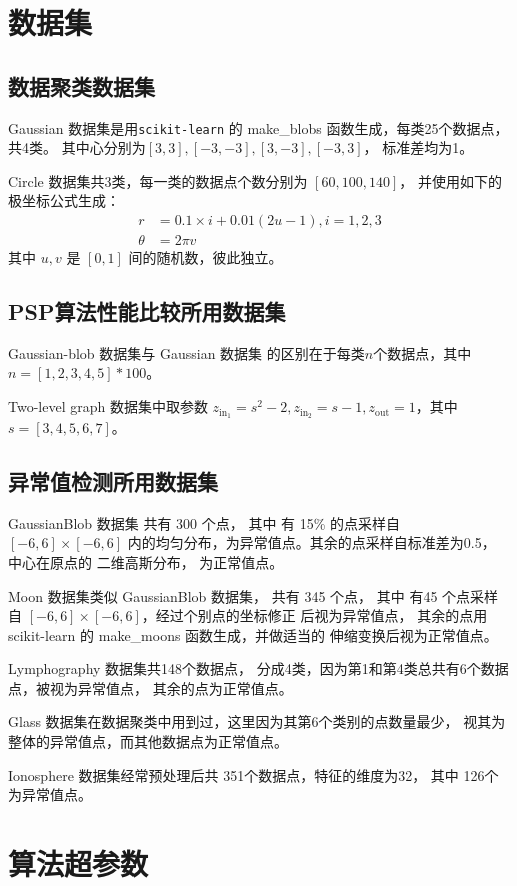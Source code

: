 \section{数据集}

\subsection{数据聚类数据集}
Gaussian 数据集是用\texttt{scikit-learn}
\cite{scikit-learn}
的 make\_blobs 函数生成，每类25个数据点，共4类。
其中心分别为$[3,3],[-3,-3],[3,-3],[-3,3]$，
标准差均为1。

Circle 数据集共3类，每一类的数据点个数分别为 $[60,100,140]$，
并使用如下的极坐标公式生成：
\begin{align*}
r &= 0.1 \times i + 0.01(2u-1), i = 1, 2, 3\\
\theta & = 2\pi v
\end{align*}
其中 $u,v$ 是 $[0,1]$ 间的随机数，彼此独立。

\subsection{PSP算法性能比较所用数据集}
Gaussian-blob 数据集与 Gaussian 数据集
的区别在于每类$n$个数据点，其中$n=[1,2,3,4,5]*100$。

Two-level graph 数据集中取参数
$z_{\mathrm{in}_1}=s^2-2,
z_{\mathrm{in}_2}=s-1,
z_{\mathrm{out}}=1$，其中$s=[3,4,5,6,7]$。
\subsection{异常值检测所用数据集}
GaussianBlob 数据集 共有 300 个点，
其中 有 15\% 的点采样自 $[-6,6]\times [-6,6]$
内的均匀分布，为异常值点。其余的点采样自标准差为0.5，
中心在原点的 二维高斯分布， 为正常值点。

Moon 数据集类似 GaussianBlob 数据集， 共有 345 个点，
其中 有45 个点采样自 $[-6,6]\times [-6,6]$，经过个别点的坐标修正
后视为异常值点，
其余的点用 scikit-learn 的 make\_moons 函数生成，并做适当的
伸缩变换后视为正常值点。

Lymphography 数据集共148个数据点，
分成4类，因为第1和第4类总共有6个数据点，被视为异常值点，
其余的点为正常值点。

Glass 数据集在数据聚类中用到过，这里因为其第6个类别的点数量最少，
视其为整体的异常值点，而其他数据点为正常值点。

Ionosphere 数据集经常预处理后共 351个数据点，特征的维度为32，
其中 126个为异常值点。

\section{算法超参数}
